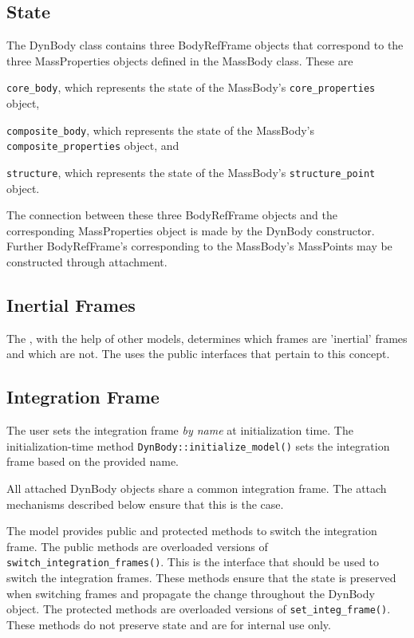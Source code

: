 \subsection{State}
The DynBody class contains three BodyRefFrame objects that correspond to the
three MassProperties objects defined in the MassBody class. These are
\begin{inparaenum}[(1)]
\item \verb+core_body+, which represents the state of the
  MassBody's \verb+core_properties+ object,
\item \verb+composite_body+, which represents the state of the
  MassBody's \verb+composite_properties+ object, and
\item \verb+structure+, which represents the state of the
  MassBody's \verb+structure_point+ object.
\end{inparaenum}
The connection between these three BodyRefFrame objects and the
corresponding MassProperties object is made by the DynBody constructor.
Further BodyRefFrame's corresponding to the MassBody's MassPoints may be
constructed through attachment.

\subsection{Inertial Frames}
The \DYNMANAGER, with the help of other models, determines which frames
are 'inertial' frames and which are not. The \ModelDesc uses the
\DYNMANAGER public interfaces that pertain to this concept.

\subsection{Integration Frame}
The user sets the integration frame \emph{by name} at initialization time.
The initialization-time method \verb+DynBody::initialize_model()+ sets the
integration frame based on the provided name.

All attached DynBody objects share a common integration frame. The attach
mechanisms described below ensure that this is the case.

The model provides public and protected methods to switch the integration frame.
The public methods are overloaded versions of
\verb+switch_integration_frames()+. This is the interface that should
be used to switch the integration frames. These methods ensure that the
state is preserved when switching frames and propagate the change throughout
the DynBody object.
The protected methods are overloaded versions of \verb+set_integ_frame()+.
These methods do not preserve state and are for internal use only.

